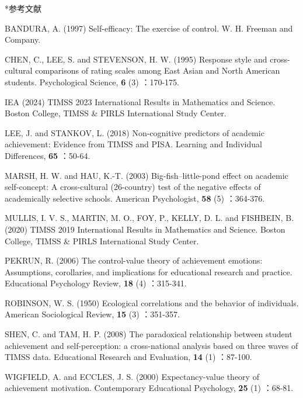 \documentclass[a4paper,10pt,twocolumn]{ltjsarticle}
\makeatletter
\renewcommand{\section}{\@startsection{section}{1}{\z@}{1.1\Cvs \@plus.4\Cdp \@minus.2\Cdp}{.5\Cvs \@plus.2\Cdp}{\normalfont\gtfamily\bfseries\large}}
\makeatother
\begin{document}
\section*{参考文献}
\begingroup\scriptsize\setlength{\parindent}{0pt}\raggedright
\par{}\zw{} BANDURA, A. (1997) Self-efficacy: The exercise of control. W. H. Freeman and Company.\vspace{1pt}
\par{}\zw{} CHEN, C., LEE, S. and STEVENSON, H. W. (1995) Response style and cross-cultural comparisons of rating scales among East Asian and North American students. Psychological Science, \textbf{6} (3) ：170-175.\vspace{1pt}
\par{}\zw{} IEA (2024) TIMSS 2023 International Results in Mathematics and Science. Boston College, TIMSS \& PIRLS International Study Center.\vspace{1pt}
\par{}\zw{} LEE, J. and STANKOV, L. (2018) Non-cognitive predictors of academic achievement: Evidence from TIMSS and PISA. Learning and Individual Differences, \textbf{65} ：50-64.\vspace{1pt}
\par{}\zw{} MARSH, H. W. and HAU, K.-T. (2003) Big-fish--little-pond effect on academic self-concept: A cross-cultural (26-country) test of the negative effects of academically selective schools. American Psychologist, \textbf{58} (5) ：364-376.\vspace{1pt}
\par{}\zw{} MULLIS, I. V. S., MARTIN, M. O., FOY, P., KELLY, D. L. and FISHBEIN, B. (2020) TIMSS 2019 International Results in Mathematics and Science. Boston College, TIMSS \& PIRLS International Study Center.\vspace{1pt}
\par{}\zw{} PEKRUN, R. (2006) The control-value theory of achievement emotions: Assumptions, corollaries, and implications for educational research and practice. Educational Psychology Review, \textbf{18} (4) ：315-341.\vspace{1pt}
\par{}\zw{} ROBINSON, W. S. (1950) Ecological correlations and the behavior of individuals. American Sociological Review, \textbf{15} (3) ：351-357.\vspace{1pt}
\par{}\zw{} SHEN, C. and TAM, H. P. (2008) The paradoxical relationship between student achievement and self-perception: a cross-national analysis based on three waves of TIMSS data. Educational Research and Evaluation, \textbf{14} (1) ：87-100.\vspace{1pt}
\par{}\zw{} WIGFIELD, A. and ECCLES, J. S. (2000) Expectancy-value theory of achievement motivation. Contemporary Educational Psychology, \textbf{25} (1) ：68-81.\vspace{1pt}
\endgroup
\end{document}
